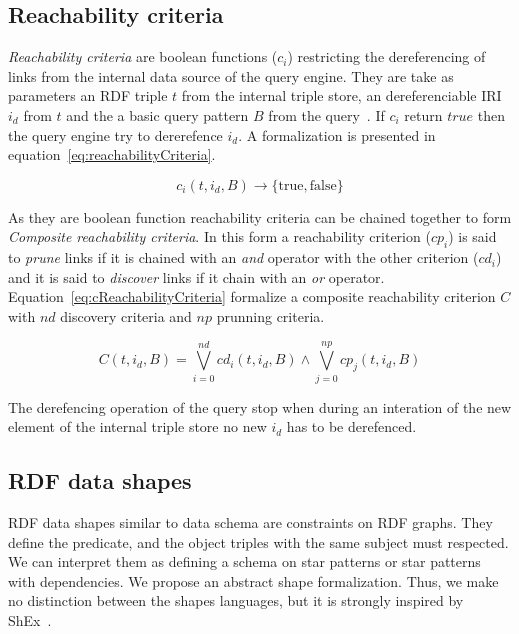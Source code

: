 \subsection{Reachability criteria}

\emph{Reachability criteria} are boolean functions ($c_i$) restricting the dereferencing of links from the internal data source of the query engine.
They are take as parameters an RDF triple $t$ from the internal triple store, an dereferenciable IRI $i_d$ from $t$ and the a basic query pattern $B$ from the query~\cite{Hartig2012}.
If $c_i$ return $true$ then the query engine try to dererefence $i_d$.
A formalization is presented in equation~\ref{eq:reachabilityCriteria}.


\begin{equation}\label{eq:reachabilityCriteria}
c_i(t, i_d, B) \rightarrow \{\mathrm{true}, \mathrm{false}\}
\end{equation}

As they are boolean function reachability criteria can be chained together to form \emph{Composite reachability criteria}.
In this form a reachability criterion ($cp_i$) is said to \emph{prune} links if it is chained with an \emph{and} operator with the other criterion ($cd_i$) and it is said to \emph{discover} links if it chain with an \emph{or} operator.
Equation~\ref{eq:cReachabilityCriteria} formalize a composite reachability criterion $C$ with $nd$ discovery criteria and $np$ prunning criteria.

\begin{equation}\label{eq:cReachabilityCriteria}
    C(t, i_d, B)  = \bigvee_{i=0}^{nd}cd_i(t, i_d, B) \land \bigvee_{j=0}^{np}cp_j(t, i_d, B)
\end{equation}

The derefencing operation of the query stop when during an interation of the new element of the internal triple store no new $i_d$ has to be derefenced.

\subsection{RDF data shapes}
RDF data shapes similar to data schema are constraints on RDF graphs.
They define the predicate, and the object triples with the same subject must respected.
We can interpret them as defining a schema on star patterns or star patterns with dependencies.
We propose an abstract shape formalization. Thus, we make no distinction between the shapes languages, but it is strongly inspired by ShEx~\cite{Gayo2018}.~

